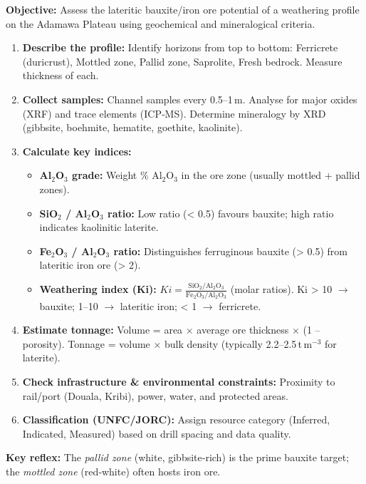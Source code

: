 \documentclass[11pt]{article}
\newcommand{\cle}[1]{{\popxbold\color{popdark}#1}}
\begin{document}
\begin{methode}
\textbf{Objective:} Assess the lateritic bauxite/iron ore potential of a weathering profile on the Adamawa Plateau using geochemical and mineralogical criteria.
\begin{enumerate}
\item \textbf{Describe the profile:} Identify horizons from top to bottom: \cle{Ferricrete} (duricrust), \cle{Mottled zone}, \cle{Pallid zone}, \cle{Saprolite}, \cle{Fresh bedrock}. Measure thickness of each.
\item \textbf{Collect samples:} Channel samples every 0.5–1\,m. Analyse for major oxides (XRF) and trace elements (ICP‑MS). Determine mineralogy by XRD (gibbsite, boehmite, hematite, goethite, kaolinite).
\item \textbf{Calculate key indices:}
\begin{itemize}
\item \textbf{Al$_2$O$_3$ grade:} Weight \% Al$_2$O$_3$ in the ore zone (usually mottled + pallid zones).
\item \textbf{SiO$_2$ / Al$_2$O$_3$ ratio:} Low ratio (< 0.5) favours bauxite; high ratio indicates kaolinitic laterite.
\item \textbf{Fe$_2$O$_3$ / Al$_2$O$_3$ ratio:} Distinguishes ferruginous bauxite (> 0.5) from lateritic iron ore (> 2).
\item \textbf{Weathering index (Ki):} $Ki = \frac{\text{SiO}_2/\text{Al}_2\text{O}_3}{\text{Fe}_2\text{O}_3/\text{Al}_2\text{O}_3}$ (molar ratios). Ki > 10 $\rightarrow$ bauxite; 1–10 $\rightarrow$ lateritic iron; < 1 $\rightarrow$ ferricrete.
\end{itemize}
\item \textbf{Estimate tonnage:} Volume = area $\times$ average ore thickness $\times$ (1 – porosity). Tonnage = volume $\times$ bulk density (typically 2.2–2.5\,t\,m$^{-3}$ for laterite).
\item \textbf{Check infrastructure \& environmental constraints:} Proximity to rail/port (Douala, Kribi), power, water, and protected areas.
\item \textbf{Classification (UNFC/JORC):} Assign resource category (Inferred, Indicated, Measured) based on drill spacing and data quality.
\end{enumerate}
\textbf{Key reflex:} The \emph{pallid zone} (white, gibbsite‑rich) is the prime bauxite target; the \emph{mottled zone} (red‑white) often hosts iron ore.
\end{methode}
\end{document}
